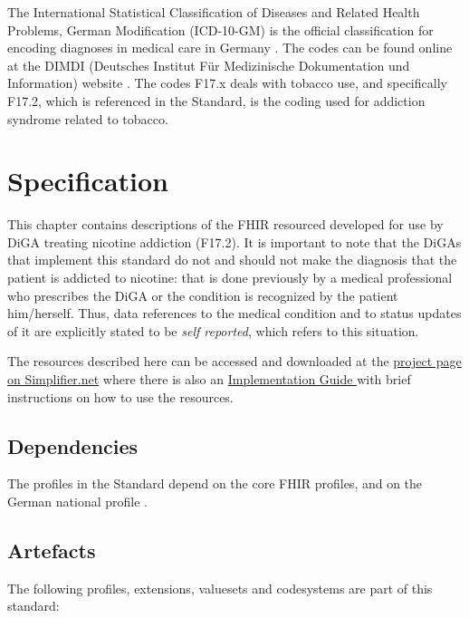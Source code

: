 \documentclass[12px]{report}
\newcommand{\fhir}{FHIR\textsuperscript{\textregistered}}
\begin{document}
The International Statistical Classification of Diseases and Related Health Problems, German Modification (ICD-10-GM) is the official classification for encoding diagnoses in medical care in Germany \cite{icd}.
The codes can be found online at the DIMDI (Deutsches Institut Für Medizinische Dokumentation und Information) website \cite{dimdi}. The codes F17.x deals with tobacco use, and specifically F17.2, which is referenced in the Standard,
is the coding used for addiction syndrome related to tobacco.


\chapter{Specification}
\label{ch:spec}

This chapter contains descriptions of the FHIR resourced developed for use by DiGA treating nicotine addiction (F17.2). It is important to note that the DiGAs that implement this standard do not and should not
make the diagnosis that the patient is addicted to nicotine: that is done previously by a medical professional who prescribes the DiGA or the condition is recognized by the patient him/herself. 
Thus, data references to the medical condition and to status updates of it are explicitly stated to be \textit{self reported}, which refers to this situation.

The resources described here can be accessed and downloaded at the \href{https://simplifier.net/treat-nicotine-usage-diga}{project page on Simplifier.net} where there is also an \href{https://simplifier.net/guide/self-reported-nicotine-usage-diga/home}{Implementation Guide } with brief instructions on how to use the resources.

\section{Dependencies}

The profiles in the Standard depend on the core \fhir \cite{FHIR} profiles, and on the German national profile \cite{debasis}.

\section{Artefacts}
The following profiles, extensions, valuesets and codesystems are part of this standard:
\end{document}
